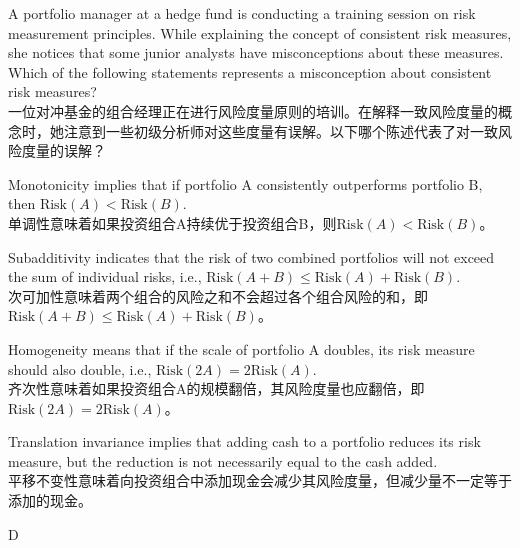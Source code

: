 \documentclass{article}
\newcounter{question} %
\begin{document}
              \begin{question}
            A portfolio manager at a hedge fund is conducting a training session on risk measurement principles. While explaining the concept of consistent risk measures, she notices that some junior analysts have misconceptions about these measures. Which of the following statements represents a misconception about consistent risk measures?
            \\一位对冲基金的组合经理正在进行风险度量原则的培训。在解释一致风险度量的概念时，她注意到一些初级分析师对这些度量有误解。以下哪个陈述代表了对一致风险度量的误解？
        \end{question}
        
        \begin{choices}
            \item Monotonicity implies that if portfolio A consistently outperforms portfolio B, then \(\text{Risk}(A) < \text{Risk}(B)\).\\
            单调性意味着如果投资组合A持续优于投资组合B，则\(\text{Risk}(A) < \text{Risk}(B)\)。
            \item Subadditivity indicates that the risk of two combined portfolios will not exceed the sum of individual risks, i.e., \(\text{Risk}(A + B) \leq \text{Risk}(A) + \text{Risk}(B)\).\\
            次可加性意味着两个组合的风险之和不会超过各个组合风险的和，即\(\text{Risk}(A + B) \leq \text{Risk}(A) + \text{Risk}(B)\)。
            \item Homogeneity means that if the scale of portfolio A doubles, its risk measure should also double, i.e., \(\text{Risk}(2A) = 2\text{Risk}(A)\).\\
            齐次性意味着如果投资组合A的规模翻倍，其风险度量也应翻倍，即\(\text{Risk}(2A) = 2\text{Risk}(A)\)。
            \item Translation invariance implies that adding cash to a portfolio reduces its risk measure, but the reduction is not necessarily equal to the cash added.\\
            平移不变性意味着向投资组合中添加现金会减少其风险度量，但减少量不一定等于添加的现金。
        \end{choices}
        
        \begin{correctanswer}
            D
        \end{correctanswer}
        
\end{document}
